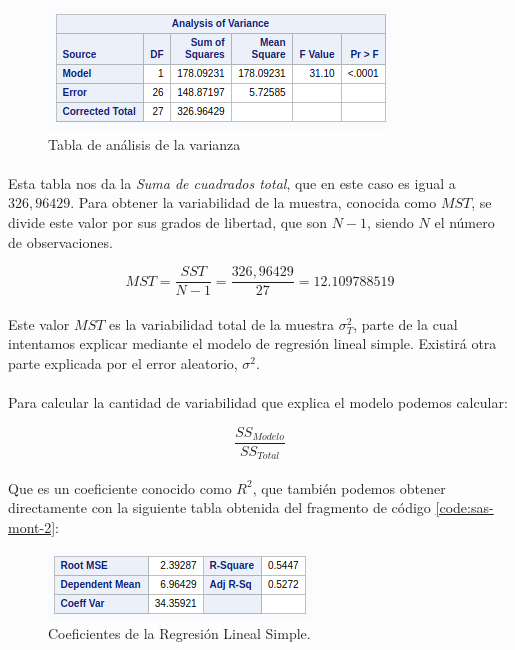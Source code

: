 \documentclass{article}
\begin{document}
  \begin{figure}[H]
    \centering
    \includegraphics[width=.5\linewidth]{img/montgomery/anovatable.png}
    \caption{Tabla de análisis de la varianza}
  \end{figure}

  \paragraph{}
  Esta tabla nos da la \textit{Suma de cuadrados total}, que en este caso es igual a $326,96429$. Para obtener la variabilidad de la muestra, conocida como $MST$, se divide este valor por sus grados de libertad, que son $N-1$, siendo $N$ el número de observaciones.

  \begin{equation}
    MST = \frac{SST}{N-1} = \frac{326,96429}{27} = 12.109788519
  \end{equation}

  \paragraph{}
  Este valor $MST$ es la variabilidad total de la muestra $\sigma_T^2$, parte de la cual intentamos explicar mediante el modelo de regresión lineal simple. Existirá otra parte explicada por el error aleatorio, $\sigma^2$.

  \paragraph{}
  Para calcular la cantidad de variabilidad que explica el modelo podemos calcular:

  \begin{equation}
    \frac{SS_{Modelo}}{SS_{Total}}
  \end{equation}

  \paragraph{}
  Que es un coeficiente conocido como $R^2$, que también podemos obtener directamente con la siguiente tabla obtenida del fragmento de código \ref{code:sas-mont-2}:

  \begin{figure}[H]
    \centering
    \includegraphics[width=.35\linewidth]{img/montgomery/tablaregaux.png}
    \caption{Coeficientes de la Regresión Lineal Simple.}
    \label{img:mont-tabla-aux}
  \end{figure}
\end{document}
